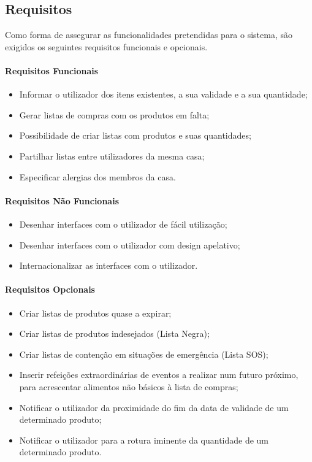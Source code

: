 %
%
\subsection{Requisitos} \label{subsec221}
Como forma de assegurar as funcionalidades pretendidas para o sistema, são exigidos os seguintes requisitos funcionais e opcionais.

\paragraph{Requisitos Funcionais}
\begin{itemize}
	\item Informar o utilizador dos itens existentes, a sua validade e a sua quantidade;
	\item Gerar listas de compras com os produtos em falta;
	\item Possibilidade de criar listas com produtos e suas quantidades;
	\item Partilhar listas entre utilizadores da mesma casa;
	\item Especificar alergias dos membros da casa.
\end{itemize}

\paragraph{Requisitos Não Funcionais}
\begin{itemize}
	\item Desenhar interfaces com o utilizador de fácil utilização;
	\item Desenhar interfaces com o utilizador com design apelativo;
	\item Internacionalizar as interfaces com o utilizador.
\end{itemize}

\paragraph{Requisitos Opcionais}
\begin{itemize}
	\item Criar listas de produtos quase a expirar;
	\item Criar listas de produtos indesejados (Lista Negra);
	\item Criar listas de contenção em situações de emergência (Lista SOS);
	\item Inserir refeições extraordinárias de eventos a realizar num futuro próximo, para acrescentar alimentos não básicos à lista de compras;
	\item Notificar o utilizador da proximidade do fim da data de validade de um determinado produto;
	\item Notificar o utilizador para a rotura iminente da quantidade de um determinado produto.
\end{itemize}

